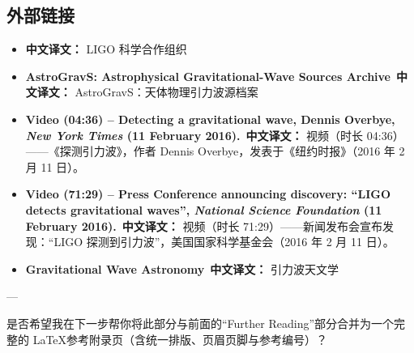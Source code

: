 \subsection{外部链接}
\begin{itemize}
\item 
\textbf{中文译文：} LIGO 科学合作组织

\item \textbf{AstroGravS: Astrophysical Gravitational-Wave Sources Archive}\
\textbf{中文译文：} AstroGravS：天体物理引力波源档案

\item \textbf{Video (04:36) – Detecting a gravitational wave, Dennis Overbye, \textit{New York Times} (11 February 2016).}\
\textbf{中文译文：} 视频（时长 04:36）——《探测引力波》，作者 Dennis Overbye，发表于《纽约时报》（2016 年 2 月 11 日）。

\item \textbf{Video (71:29) – Press Conference announcing discovery: ``LIGO detects gravitational waves'', \textit{National Science Foundation} (11 February 2016).}\
\textbf{中文译文：} 视频（时长 71:29）——新闻发布会宣布发现：“LIGO 探测到引力波”，美国国家科学基金会（2016 年 2 月 11 日）。

\item \textbf{Gravitational Wave Astronomy}\
\textbf{中文译文：} 引力波天文学
\end{itemize}

---

是否希望我在下一步帮你将此部分与前面的“Further Reading”部分合并为一个完整的 \LaTeX 参考附录页（含统一排版、页眉页脚与参考编号）？
